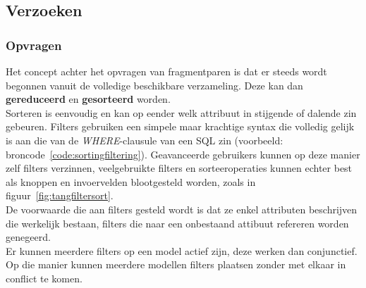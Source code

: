 \subsection{Verzoeken}

\subsubsection{Opvragen}
Het concept achter het opvragen van fragmentparen is dat er steeds wordt begonnen vanuit de volledige beschikbare verzameling. Deze kan dan \textbf{gereduceerd} en \textbf{gesorteerd} worden. \\

Sorteren is eenvoudig en kan op eender welk attribuut in stijgende of dalende zin gebeuren. Filters gebruiken een simpele maar krachtige syntax die volledig gelijk is aan die van de \emph{WHERE}-clausule van een SQL zin (voorbeeld: broncode~\ref{code:sortingfiltering}). Geavanceerde gebruikers kunnen op deze manier zelf filters verzinnen, veelgebruikte filters en sorteeroperaties kunnen echter best als knoppen en invoervelden blootgesteld worden, zoals in figuur~\ref{fig:tangfiltersort}.\\

De voorwaarde die aan filters gesteld wordt is dat ze enkel attributen beschrijven die werkelijk bestaan, filters die naar een onbestaand attibuut refereren worden genegeerd.\\

Er kunnen meerdere filters op een model actief zijn, deze werken dan conjunctief. Op die manier kunnen meerdere modellen filters plaatsen zonder met elkaar in conflict te komen. 




